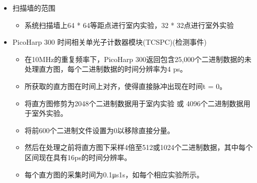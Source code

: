 \documentclass[11pt]{article}
\providecommand{\tightlist}{%
      \setlength{\itemsep}{0pt}\setlength{\parskip}{0pt}}
\begin{document}
\begin{itemize}
\tightlist
\item
  扫描墙的范围

  \begin{itemize}
  \tightlist
  \item
    系统扫描墙上64 * 64等距点进行室内实验，32 * 32点进行室外实验
  \end{itemize}
\item
  PicoHarp 300 时间相关单光子计数器模块(TCSPC)(检测事件)

  \begin{itemize}
  \tightlist
  \item
    在10MHz的重复频率下，PicoHarp
    300返回包含25,000个二进制数据的未处理直方图，每个二进制数据的时间分辨率为4
    ps。
  \item
    所获取的直方图在时间上对齐，使得直接脉冲出现在时间t = 0。
  \item
    将直方图修剪为2048个二进制数据用于室内实验 或
    4096个二进制数据用于室外实验。
  \item
    将前600个二进制文件设置为0以移除直接分量。
  \item
    然后在处理之前将直方图下采样4倍至512或1024个二进制数据，其中每个区间现在具有16ps的时间分辨率。
  \item
    每个直方图的采集时间为0.1μs1s，如每个相应实验所示。
  \end{itemize}
\end{itemize}
\end{document}
